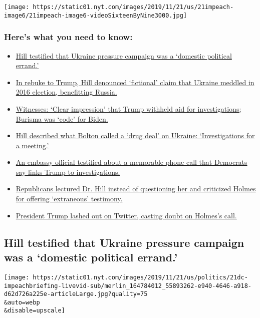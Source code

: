 \texttt{[image: https://static01.nyt.com/images/2019/11/21/us/21impeach-image6/21impeach-image6-videoSixteenByNine3000.jpg]}

\hypertarget{heres-what-you-need-to-know}{%
\subsubsection{Here's what you need to
know:}\label{heres-what-you-need-to-know}}

\begin{itemize}
\tightlist
\item
  \protect\hyperlink{link-69e7e420}{Hill testified that Ukraine pressure
  campaign was a `domestic political errand.'}
\item
  \protect\hyperlink{link-30488cd2}{In rebuke to Trump, Hill denounced
  `fictional' claim that Ukraine meddled in 2016 election, benefitting
  Russia.}
\item
  \protect\hyperlink{link-7876105c}{Witnesses: `Clear impression' that
  Trump withheld aid for investigations; Burisma was `code' for Biden.}
\item
  \protect\hyperlink{link-679b5ee2}{Hill described what Bolton called a
  `drug deal' on Ukraine: `Investigations for a meeting.'}
\item
  \protect\hyperlink{link-46b315d7}{An embassy official testified about
  a memorable phone call that Democrats say links Trump to
  investigations.}
\item
  \protect\hyperlink{link-1488119b}{Republicans lectured Dr. Hill
  instead of questioning her and criticized Holmes for offering
  `extraneous' testimony.}
\item
  \protect\hyperlink{link-360100b6}{President Trump lashed out on
  Twitter, casting doubt on Holmes's call.}
\end{itemize}

\hypertarget{hill-testified-that-ukraine-pressure-campaign-was-a-domestic-political-errand}{%
\subsection{Hill testified that Ukraine pressure campaign was a
`domestic political
errand.'}\label{hill-testified-that-ukraine-pressure-campaign-was-a-domestic-political-errand}}

\texttt{[image: https://static01.nyt.com/images/2019/11/21/us/politics/21dc-impeachbriefing-livevid-sub/merlin\_164784012\_55893262-e940-4646-a918-d62d726a225e-articleLarge.jpg?quality=75\\\&auto=webp\\\&disable=upscale]}

